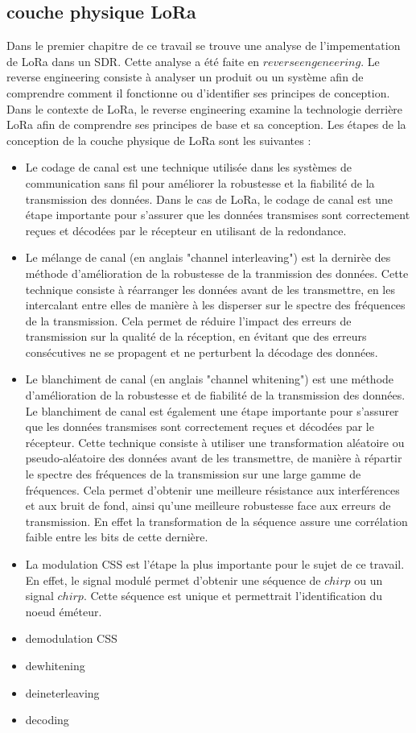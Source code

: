 \documentclass[12pt,a4paper,oneside, titlepage]{report}
\begin{document}
\subsection{couche physique LoRa}

Dans le premier chapitre de ce travail se trouve une analyse de l'impementation de LoRa dans un SDR. Cette analyse a été faite en $reverse engeneering$. Le reverse engineering consiste à analyser un produit ou un système afin de comprendre comment il fonctionne ou d'identifier ses principes de conception. Dans le contexte de LoRa, le reverse engineering examine la technologie derrière LoRa afin de comprendre ses principes de base et sa conception. Les étapes de la conception de la couche physique de LoRa sont les suivantes :
\begin{itemize}
\item Le codage de canal est une technique utilisée dans les systèmes de communication sans fil pour améliorer la robustesse et la fiabilité de la transmission des données. Dans le cas de LoRa, le codage de canal est une étape importante pour s'assurer que les données transmises sont correctement reçues et décodées par le récepteur en utilisant de la redondance.
\item Le mélange de canal (en anglais "channel interleaving") est la dernirèe des méthode d'amélioration de la robustesse de la tranmission des données. 
Cette technique consiste à réarranger les données avant de les transmettre, en les intercalant entre elles de manière à les disperser sur le spectre des fréquences de la transmission. Cela permet de réduire l'impact des erreurs de transmission sur la qualité de la réception, en évitant que des erreurs consécutives ne se propagent et ne perturbent la décodage des données.
\item Le blanchiment de canal (en anglais "channel whitening") est une méthode d'amélioration de la robustesse et de fiabilité de la transmission des données. Le blanchiment de canal est également une étape importante pour s'assurer que les données transmises sont correctement reçues et décodées par le récepteur.
Cette technique consiste à utiliser une transformation aléatoire ou pseudo-aléatoire des données avant de les transmettre, de manière à répartir le spectre des fréquences de la transmission sur une large gamme de fréquences. Cela permet d'obtenir une meilleure résistance aux interférences et aux bruit de fond, ainsi qu'une meilleure robustesse face aux erreurs de transmission. En effet la transformation de la séquence assure une corrélation faible entre les bits de cette dernière.
\item La modulation CSS est l'étape la plus importante pour le sujet de ce travail. En effet, le signal modulé permet d'obtenir une séquence de $chirp$ ou un signal $chirp$. Cette séquence est unique et permettrait l'identification du noeud éméteur. 
\item demodulation CSS
\item dewhitening
\item deineterleaving
\item decoding
\end{itemize}
\end{document}
